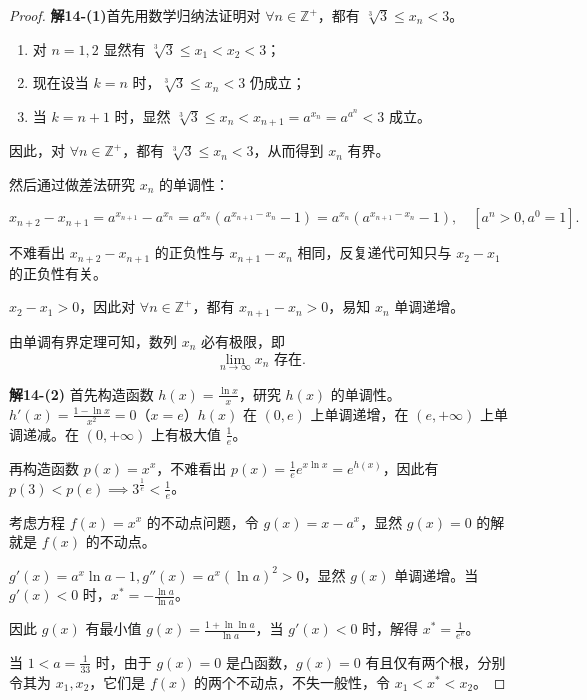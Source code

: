 \documentclass[12pt]{ctexart}
\begin{document}
\begin{proof}
\textbf{解14-(1)}首先用数学归纳法证明对 $\forall n \in \mathbb{Z}^+$，都有 $\sqrt[3]{3} \leq x_n < 3$。

\begin{enumerate}
    \item 对 $n = 1, 2$ 显然有 $\sqrt[3]{3} \leq x_1 < x_2 < 3$；
    \item 现在设当 $k = n$ 时，$\sqrt[3]{3} \leq x_n < 3$ 仍成立；
    \item 当 $k = n + 1$ 时，显然 $\sqrt[3]{3} \leq x_n < x_{n+1} = a^{x_n} = a^{a^n} < 3$ 成立。
\end{enumerate}

因此，对 $\forall n \in \mathbb{Z}^+$，都有 $\sqrt[3]{3} \leq x_n < 3$，从而得到 $x_n$ 有界。

然后通过做差法研究 $x_n$ 的单调性：

\[
x_{n+2} - x_{n+1} = a^{x_{n+1}} - a^{x_n} = a^{x_n} \left( a^{x_{n+1} - x_n} - 1 \right) = a^{x_n} \left( a^{x_{n+1} - x_n} - 1 \right), \quad [a^n > 0, a^0 = 1].
\]

不难看出 $x_{n+2} - x_{n+1}$ 的正负性与 $x_{n+1} - x_n$ 相同，反复递代可知只与 $x_2 - x_1$ 的正负性有关。

$x_2 - x_1 > 0$，因此对 $\forall n \in \mathbb{Z}^+$，都有 $x_{n+1} - x_n > 0$，易知 $x_n$ 单调递增。

由单调有界定理可知，数列 $x_n$ 必有极限，即
\[
\lim_{n \to \infty} x_n \text{ 存在}.
\]

\textbf{解14-(2)}
首先构造函数 $h(x) = \frac{\ln x}{x}$，研究 $h(x)$ 的单调性。$h'(x) = \frac{1 - \ln x}{x^2} = 0$（$x = e$）$h(x)$ 在 $(0, e)$ 上单调递增，在 $(e, +\infty)$ 上单调递减。在 $(0, +\infty)$ 上有极大值 $\frac{1}{e}$。

再构造函数 $p(x) = x^x$，不难看出 $p(x) = \frac{1}{e} e^{x \ln x} = e^{h(x)}$，因此有 $p(3) < p(e) \implies 3^{\frac{1}{e}} < \frac{1}{e}$。

考虑方程 $f(x) = x^x$ 的不动点问题，令 $g(x) = x - a^x$，显然 $g(x) = 0$ 的解就是 $f(x)$ 的不动点。

$g'(x) = a^x \ln a - 1, g''(x) = a^x (\ln a)^2 > 0$，显然 $g(x)$ 单调递增。当 $g'(x) < 0$ 时，$x^* = -\frac{\ln a}{\ln a}$。

因此 $g(x)$ 有最小值 $g(x) = \frac{1 + \ln \ln a}{\ln a}$，当 $g'(x) < 0$ 时，解得 $x^* = \frac{1}{e^e}$。

当 $1 < a = \frac{1}{33}$ 时，由于 $g(x) = 0$ 是凸函数，$g(x) = 0$ 有且仅有两个根，分别令其为 $x_1, x_2$，它们是 $f(x)$ 的两个不动点，不失一般性，令 $x_1 < x^* < x_2$。


\end{proof}
\end{document}
